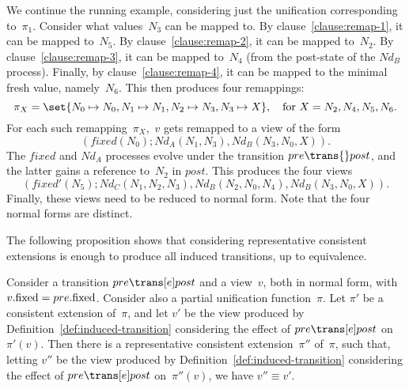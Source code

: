 
\begin{example}
We continue the running example, considering just the unification
corresponding to~$\pi_1$.  Consider what values~$N_3$ can be mapped to.  By
clause~\ref{clause:remap-1}, it can be mapped to~$N_5$.  By
clause~\ref{clause:remap-2}, it can be mapped to~$N_2$.  By
clause~\ref{clause:remap-3}, it can be mapped to~$N_4$ (from the post-state of
the $Nd_B$ process).  Finally, by clause~\ref{clause:remap-4}, it can be
mapped to the minimal fresh value, namely~$N_6$.
%
This then produces four remappings:
\[
\pi_X = \set{N_0 \mapsto N_0, N_1 \mapsto N_1, N_2 \mapsto N_3, N_3 \mapsto X},
\quad \mbox{for $X = N_2, N_4, N_5, N_6$}.
\]
For each such remapping~$\pi_X$,\, $v$ gets remapped to a view of the form
\[
(fixed(N_0); Nd_A(N_1, N_3), Nd_B(N_3, N_0, X)).
\]
The $fixed$ and $Nd_A$ processes evolve under the transition \( pre
\trans{} post \), and the latter gains a reference to~$N_2$ in
$post$.  This produces the four views
\[
(fixed'(N_5); Nd_C(N_1, N_2, N_3), Nd_B(N_2, N_0, N_4), Nd_B(N_3, N_0, X)).
\]
Finally, these views need to be reduced to normal form.  Note that the four
normal forms are distinct.
\end{example}


The following proposition shows that considering representative consistent
extensions is enough to produce all induced transitions, up to equivalence. 
%
\begin{prop}
\label{prop:unifying-remapping}
Consider a transition $pre \trans[e] post$ and a view~$v$, both in normal
form, with $v.\mathrm{fixed} = pre.\mathrm{fixed}$.  Consider also a partial unification
function~$\pi$.
%
Let $\pi'$ be a consistent extension of~$\pi$, and
let $v'$ be the view produced by Definition~\ref{def:induced-transition}
considering the effect of $pre \trans[e] post$ on~$\pi'(v)$.  
%
Then there is a representative consistent extension~$\pi''$ of~$\pi$, such
that, letting $v''$ be the view produced by
Definition~\ref{def:induced-transition} considering the effect of $pre
\trans[e] post$ on~$\pi''(v)$, we have $v'' \equiv v'$.
\end{prop}


